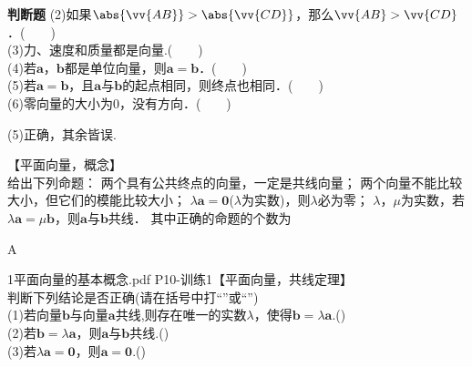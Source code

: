 \begin{exercise}{\textbf{判断题}}
      (2)如果$\abs{\vv{AB}}>\abs{\vv{CD}}$，那么$\vv{AB}>\vv{CD}$．(　　)\\
      (3)力、速度和质量都是向量.(　　)\\
      (4)若$\bm a$，$\bm b$都是单位向量，则$\bm a=\bm b$．(　　)\\
      (5)若$\bm a=\bm b$，且$\bm a$与$\bm b$的起点相同，则终点也相同．(　　)\\
      (6)零向量的大小为0，没有方向．(　　)
      \begin{answer}
        (5)正确，其余皆误.
      \end{answer}
    \item 【平面向量，概念】\\
      给出下列命题：
      两个具有公共终点的向量，一定是共线向量；
      两个向量不能比较大小，但它们的模能比较大小；
      $\lambda\bm{a}=\bm{0}$($\lambda$为实数)，则$\lambda$必为零；
      $\lambda$，$\mu$为实数，若$\lambda\bm{a}=\mu\bm{b}$，则$\bm{a}$与$\bm{b}$共线．
      其中正确的命题的个数为\xz
      \begin{answer}
        A
      \end{answer}
    \item 1平面向量的基本概念.pdf P10-训练1【平面向量，共线定理】\\
      判断下列结论是否正确(请在括号中打“\checkmark”或“\XSolidBrush”)\\
      (1)若向量$\bm b$与向量$\bm{a}$共线,则存在唯一的实数$ \lambda $，使得$\bm{b}=\lambda\bm{a}$.(\hspace{2em})\\
      (2)若$\bm{b}=\lambda\bm{a}$，则$\bm a$与$\bm b$共线.(\hspace{2em})\\
      (3)若$\lambda\bm a=\bm 0$，则$\bm a=\bm 0$.(\hspace{2em})\\
  \end{exercise}
